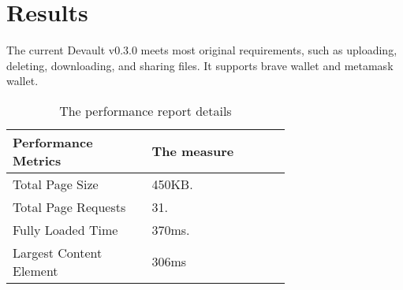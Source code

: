 \section{Results}


The current Devault v0.3.0 meets most original requirements, such as uploading, deleting, downloading, and sharing files. It supports brave wallet and metamask wallet.



\begin{table}[!ht]
  \centering
  \caption{The performance report details}
  \begin{tabular}{p{0.35\linewidth} p{0.35\linewidth}}
    \toprule
    Performance Metrics & The measure
    \\\midrule
    Total Page Size & 450KB. \\
    Total Page Requests & 31. \\
    Fully Loaded Time & 370ms. \\
    Largest Content Element & 306ms
    \\\bottomrule
  \end{tabular}
\end{table}
